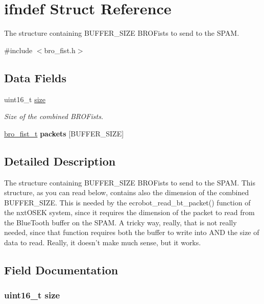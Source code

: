 \hypertarget{structifndef}{
\section{ifndef Struct Reference}
\label{structifndef}
}


The structure containing BUFFER\_\-SIZE BROFists to send to the SPAM.  




{\ttfamily \#include $<$bro\_\-fist.h$>$}

\subsection*{Data Fields}
\begin{DoxyCompactItemize}
\item 
uint16\_\-t \hyperlink{structifndef_aaba88b24a21a6c70c895c0d55f4a69a0}{size}
\begin{DoxyCompactList}\small\item\em Size of the combined BROFists. \item\end{DoxyCompactList}\item 
\hypertarget{structifndef_a5cccc799a79e4430d894573577992c2d}{
\hyperlink{structbro__fist__t}{bro\_\-fist\_\-t} {\bfseries packets} \mbox{[}BUFFER\_\-SIZE\mbox{]}}
\label{structifndef_a5cccc799a79e4430d894573577992c2d}

\end{DoxyCompactItemize}


\subsection{Detailed Description}
The structure containing BUFFER\_\-SIZE BROFists to send to the SPAM. This structure, as you can read below, contains also the dimension of the combined BUFFER\_\-SIZE. This is needed by the ecrobot\_\-read\_\-bt\_\-packet() function of the nxtOSEK system, since it requires the dimension of the packet to read from the BlueTooth buffer on the SPAM. A tricky way, really, that is not really needed, since that function requires both the buffer to write into AND the size of data to read. Really, it doesn't make much sense, but it works. 

\subsection{Field Documentation}
\hypertarget{structifndef_aaba88b24a21a6c70c895c0d55f4a69a0}{
\subsubsection[{size}]{\setlength{\rightskip}{0pt plus 5cm}uint16\_\-t {\bf size}}}
\label{structifndef_aaba88b24a21a6c70c895c0d55f4a69a0}



